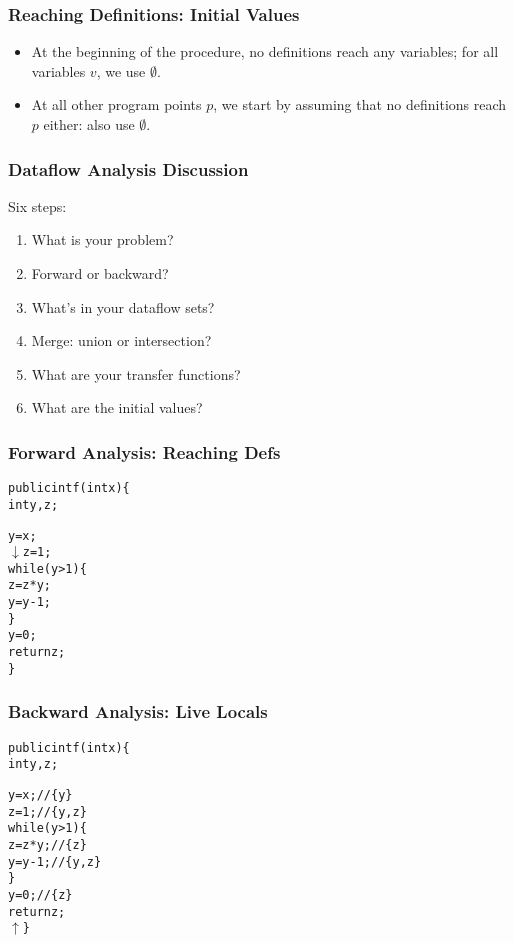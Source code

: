 \documentclass{beamer}
\begin{document}
\begin{frame}
  \frametitle{Reaching Definitions: Initial Values}

\begin{itemize}
\item At the beginning of the procedure, no definitions reach any
variables; for all variables $v$, we use $\emptyset$.
\item At all other program points $p$, we start by assuming that no
definitions reach $p$ either: also use $\emptyset$.
\end{itemize}
\end{frame}

\begin{frame}
  \frametitle{Dataflow Analysis Discussion}

Six steps:

\begin{enumerate}
\item What is your problem?
\item Forward or backward?
\item What's in your dataflow sets?
\item Merge: union or intersection?
\item What are your transfer functions?
\item What are the initial values?
\end{enumerate}
\end{frame}

\begin{frame}[fragile]
  \frametitle{Forward Analysis: Reaching Defs}
  \begin{alltt}
    public int f(int x) \{
      int y, z;

      y = x;
\( \downarrow \)   \alert{z} = 1; 
      while (y > 1) \{
        z = \alert{z} * y;
        y = y - 1;
      \}
      y = 0;
      return z;
    \}
  \end{alltt}

\end{frame}

\begin{frame}[fragile]
  \frametitle{Backward Analysis: Live Locals}
  \begin{alltt}
    public int f(int x) \{
      int y, z;

      y = x;                   // \{ y \}
      z = 1;                   // \{ y, z \}
      while (y > 1) \{
        z = z * y;             // \{ z \}
        y = y - 1;             // \{ y, z \}
      \}
      y = 0;                   // \{ z \}
      return z;
\( \uparrow \) \}
  \end{alltt}

\end{frame}
\end{document}
